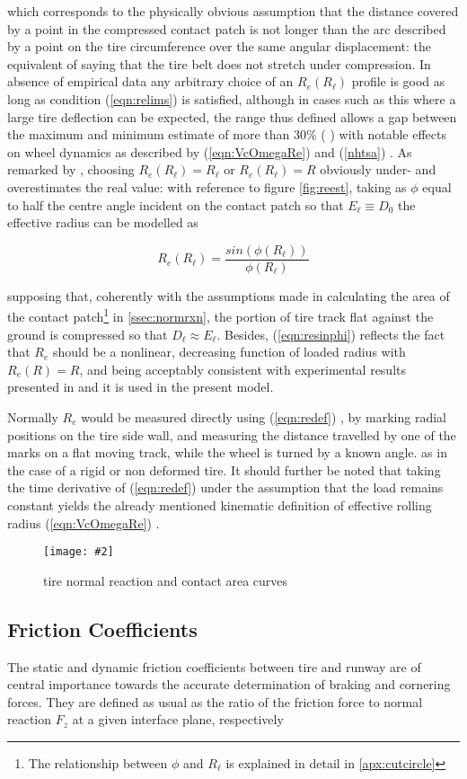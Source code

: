 \documentclass[12pt,a4paper]{report}
\newcommand{\figura}[5][htbp]{
\begin{figure}[#1]
\begin{center}
\texttt{[image: \#2]}
\caption{#4}\label{#5}
\end{center}
\end{figure}
}
\newcommand{\eq}[2]{
\begin{equation} \label{#1}
#2
\end{equation}
}
\newcommand{\req}[1]{
(\ref{#1})
}
\begin{document}
which corresponds to the physically obvious assumption that the distance covered by a point in the compressed contact patch is not longer than the arc described by a point on the tire circumference over the same angular displacement: the equivalent of saying that the tire belt does not stretch under  compression.
In absence of empirical data any arbitrary choice of an $R_e(R_\ell)$ profile is good as long as condition \req{eqn:relims} is satisfied, although in cases such as this where a large tire deflection can be expected, the range thus defined allows a gap between the maximum and minimum estimate of more than 30\% (\cite{GYtirespecs} ) with notable effects on wheel dynamics as described by \req{eqn:VcOmegaRe} and \req{nhtsa}.
As remarked by \cite{wkg}, choosing $R_e(R_\ell)=R_\ell$ or $R_e(R_\ell)=R$ obviously under- and overestimates the real value: with reference to figure \ref{fig:reest}, taking as $\phi$ equal to half the centre angle incident on the contact patch so that $E_\ell \equiv D_0$ the effective radius can be modelled as 
\eq{eqn:resinphi}{ R_e(R_\ell) = \frac{sin(\phi(R_\ell))}{\phi(R_\ell)}}
supposing that, coherently with the assumptions made in calculating the area of the contact patch\footnote{The relationship between $\phi$ and $R_\ell$ is explained in detail in \ref{apx:cutcircle}} in \ref{ssec:normrxn}, the portion of tire track flat against the ground is compressed so that $D_\ell \approx E_\ell$.
Besides, \req{eqn:resinphi} reflects the fact that $R_e$ should be a nonlinear, decreasing function of loaded radius with $R_e(R)=R$, and being acceptably consistent with experimental results presented in \cite{wkg} and \cite{Misset} it is used in the present model.

Normally $R_e$ would be measured directly using \req{eqn:redef} , by marking radial positions on the tire side wall, and measuring the distance travelled by one of the marks on a flat moving track, while the wheel is turned by a known angle. as in the case of a rigid or non deformed tire.
It should further be noted that taking the time derivative of \req{eqn:redef} under the assumption that the load remains constant yields the already mentioned kinematic definition of effective rolling radius \req{eqn:VcOmegaRe}.

\figura{piczero.jpg}{}{tire normal reaction and contact area curves}{fig:tirecurves}


\subsection{Friction Coefficients}
The static and dynamic friction coefficients between tire and runway are of central importance towards the accurate determination of braking and cornering forces.
They are defined as usual as the ratio of the friction force to normal reaction $F_z$ at a given interface plane, respectively
\end{document}

